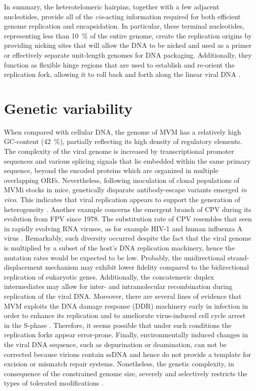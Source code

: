 In summary, the heterotelomeric hairpins, together with a few adjacent nucleotides, provide all of the \textit{cis}-acting information required for both efficient genome replication and encapsidation. In particular, these terminal nucleotides, representing less than 10~\% of the entire genome, create the replication origins by providing nicking sites that will allow the DNA to be nicked and used as a primer or effectively separate unit-length genomes for DNA packaging. Additionally, they function as flexible hinge regions that are used to establish and re-orient the replication fork, allowing it to roll back and forth along the linear viral DNA \cite{telomere2, telomere3, handbook, RHR}.        

\section{Genetic variability}

When compared with cellular DNA, the genome of MVM has a relatively high GC-content (42~\%), partially reflecting its high density of regulatory elements. The complexity of the viral genome is increased by transcriptional promoter sequences and various splicing signals that lie embedded within the same primary sequence, beyond the encoded proteins which are organized in multiple overlapping ORFs. Nevertheless, following inoculation of clonal populations of MVMi stocks in mice, genetically disparate antibody-escape variants emerged \textit{in vivo}. This indicates that viral replication appears to support the generation of heterogeneity \cite{pmid12552010}. Another example concerns the emergent branch of CPV during its evolution from FPV since 1978. The substitution rate of CPV resembles that seen in rapidly evolving RNA viruses, as for example HIV-1 and human influenza A virus \cite{pmid15626758}. Remarkably, such diversity occurred despite the fact that the viral genome is multiplied by a subset of the host's DNA replication machinery, hence the mutation rates would be expected to be low. Probably, the unidirectional strand-displacement mechanism may exhibit lower fidelity compared to the bidirectional replication of eukaryotic genes. Additionally, the concatemeric duplex intermediates may allow for inter- and intramolecular recombination during replication of the viral DNA. Moreover, there are several lines of evidence that MVM exploits the DNA damage response (DDR) machinery early in infection in order to enhance its replication and to ameliorate virus-induced cell cycle arrest in the S-phase \cite{pmid20949077}. Therefore, it seems possible that under such conditions the replication forks appear error-prone. Finally, environmentally induced changes in the viral DNA sequence, such as depurination or deamination, can not be corrected because virions contain ssDNA and hence do not provide a template for excision or mismatch repair systems. Nonetheless, the genetic complexity, in consequence of the constrained genome size, severely and selectively restricts the types of tolerated modifications \cite{telomere}.   


